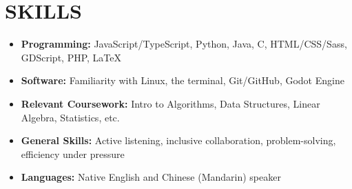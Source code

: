 \documentclass[letterpaper,10pt]{extarticle}
\begin{document}
\section*{SKILLS}
\begin{itemize}
    \item \textbf{Programming:} JavaScript/TypeScript, Python, Java, C, HTML/CSS/Sass, GDScript, PHP, {\selectfont \LaTeX}
    \item \textbf{Software:} Familiarity with Linux, the terminal, Git/GitHub, Godot Engine
    \item \textbf{Relevant Coursework:} Intro to Algorithms, Data Structures, Linear Algebra, Statistics, etc.
    \item \textbf{General Skills:} Active listening, inclusive collaboration, problem-solving, efficiency under pressure
    \item \textbf{Languages:} Native English and Chinese (Mandarin) speaker
\end{itemize}

\end{document}
